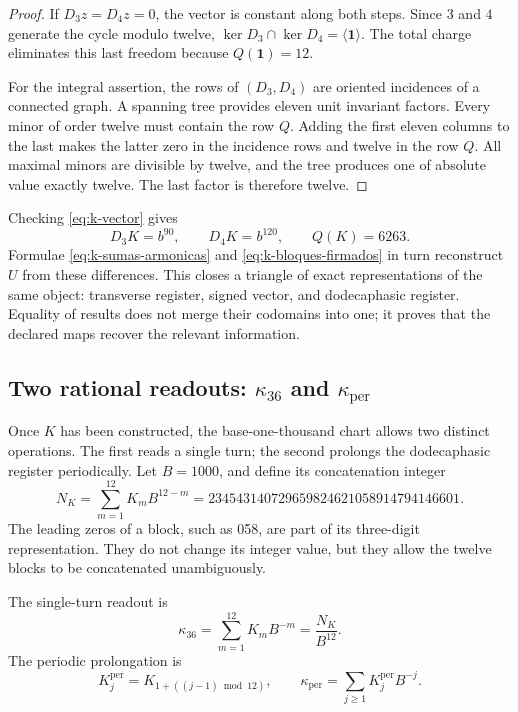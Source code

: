 \begin{proof}
If \(D_3z=D_4z=0\), the vector is constant along both steps.
Since \(3\) and \(4\) generate the cycle modulo twelve,
\(\ker D_3\cap\ker D_4=\langle\mathbf1\rangle\). The total charge
eliminates this last freedom because \(Q(\mathbf1)=12\).

For the integral assertion, the rows of \((D_3,D_4)\) are oriented
incidences of a connected graph. A spanning tree provides eleven
unit invariant factors. Every minor of order twelve must contain the
row \(Q\). Adding the first eleven columns to the last makes the latter
zero in the incidence rows and twelve in the row \(Q\). All
maximal minors are divisible by twelve, and the tree produces one of
absolute value exactly twelve. The last factor is therefore twelve.
\end{proof}

Checking \eqref{eq:k-vector} gives
\[
 D_3K=b^{90},\qquad D_4K=b^{120},\qquad Q(K)=6263.
\]
Formulae \eqref{eq:k-sumas-armonicas} and
\eqref{eq:k-bloques-firmados} in turn reconstruct \(U\) from these
differences. This closes a triangle of exact representations of the
same object: transverse register, signed vector, and dodecaphasic register. Equality
of results does not merge their codomains into one; it proves that
the declared maps recover the relevant information.



\subsection{Two rational readouts: \texorpdfstring{\(\kappa_{36}\)}{kappa36} and \texorpdfstring{\(\kappa_{\mathrm{per}}\)}{periodic kappa}}
\label{subsec:k-kappas}

Once \(K\) has been constructed, the base-one-thousand chart allows two distinct
operations. The first reads a single turn; the second prolongs the dodecaphasic register
periodically. Let \(B=1000\), and define its concatenation integer
\begin{equation}
 N_K=\sum_{m=1}^{12}K_mB^{12-m}
 =234543140729659824621058914794146601.
 \label{eq:k-numerador}
\end{equation}
The leading zeros of a block, such as 058, are part of its three-digit
representation. They do not change its integer value, but they allow
the twelve blocks to be concatenated unambiguously.

\begin{definition}
\label{def:k-kappas}
The single-turn readout is
\[
 \kappa_{36}=\sum_{m=1}^{12}K_mB^{-m}=\frac{N_K}{B^{12}}.
\]
The periodic prolongation is
\[
 K_j^{\mathrm{per}}=K_{1+((j-1)\bmod12)},\qquad
 \kappa_{\mathrm{per}}=\sum_{j\geq1}K_j^{\mathrm{per}}B^{-j}.
\]
\end{definition}

